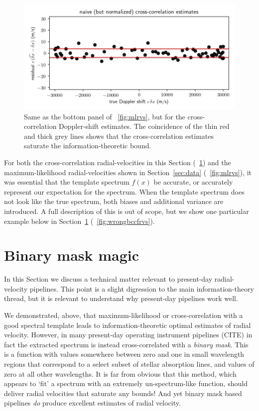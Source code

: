 \documentclass[modern]{aastex631}
\newcommand{\sectionname}{Section}
\newcommand{\secref}[1]{\sectionname~\ref{#1}}
\newcommand{\figref}[1]{\figurename~\ref{#1}}
\begin{document}
\begin{figure}[tp]
  \begin{mdframed}
    \begin{center}
    \includegraphics[width=\textwidth]{../notebook/ccfrvs.png}
    \end{center}
    \caption{Same as the bottom panel of \figref{fig:mlrvs}, but for the cross-correlation Doppler-shift estimates. The coincidence of the thin red and thick grey lines shows that the cross-correlation estimates saturate the information-theoretic bound.\label{fig:ccfrvs}}
  \end{mdframed}
\end{figure}

For both the cross-correlation radial-velocities in this \sectionname{} (\figref{fig:ccfrvs}) and the maximum-likelihood radial-velocities shown in \secref{sec:data} (\figref{fig:mlrvs}), it was essential that the template spectrum $f(x)$ be accurate, or accurately represent our expectation for the spectrum.
When the template spectrum does not look like the true spectrum, both biases and additional variance are introduced.
A full description of this is out of scope, but we show one particular example below in \secref{sec:binary} (\figref{fig:wrongbccfrvs}).

\section{Binary mask magic}\label{sec:binary}

In this \sectionname{} we discuss a technical matter relevant to present-day radial-velocity pipelines.
This point is a slight digression to the main information-theory thread, but it is relevant to understand why present-day pipelines work well.

We demonstrated, above, that maximum-likelihood or cross-correlation with a good spectral template leads to information-theoretic optimal estimates of radial velocity.
However, in many present-day operating instrument pipelines (CITE) in fact the extracted spectrum is instead cross-correlated with a \emph{binary mask}.
This is a function with values somewhere between zero and one in small wavelength regions that correspond to a select subset of stellar absorption lines, and values of zero at all other wavelengths. 
It is far from obvious that this method, which appears to `fit' a spectrum with an extremely un-spectrum-like function, should deliver radial velocities that saturate any bounds!
And yet binary mask based pipelines \emph{do} produce excellent estimates of radial velocity.
\end{document}
